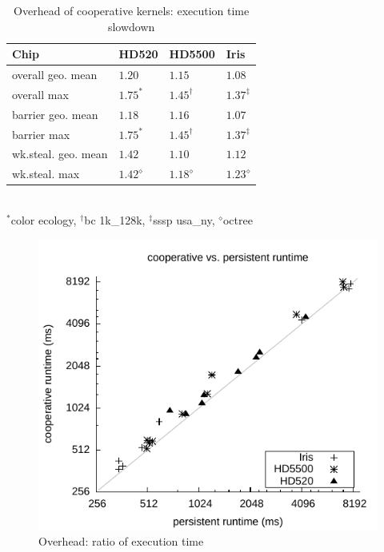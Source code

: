 \documentclass[numbers,nocopyrightspace,10pt]{sigplanconf}
\begin{document}
\begin{table}
\small
\centering
\begin{tabular}{ l l l l }
Chip & HD520 & HD5500 & Iris\\
\hline
overall geo. mean  & $1.20$ & $1.15$ & $1.08$ \\
overall max & $1.75^{\ast}$ & $1.45^{\dagger}$ & $1.37^{\ddagger}$ \\

\hline
barrier geo. mean & $1.18$ & $1.16$ & $1.07$ \\
barrier max & $1.75^{\ast}$ & $1.45^{\dagger}$ & $1.37^{\ddagger}$ \\

\hline
wk.steal. geo. mean & $1.42$ & $1.10$ & $1.12$ \\
wk.steal. max & $1.42^{\diamond}$ & $1.18^{\diamond}$ & $1.23^{\diamond}$ \\

\hline
\end{tabular}\\
{\footnotesize
$^{\ast}$color ecology, $^{\dagger}$bc 1k\_128k, $^{\ddagger}$sssp usa\_ny, $^{\diamond}$octree
}
\caption{Overhead of cooperative kernels: execution time slowdown}
\label{tab:overhead}
\end{table}

\begin{figure}
\includegraphics[width=\columnwidth]{cooperative_overhead.pdf}
\caption{Overhead: ratio of execution time}\label{fig:overhead}
\end{figure}
\end{document}
